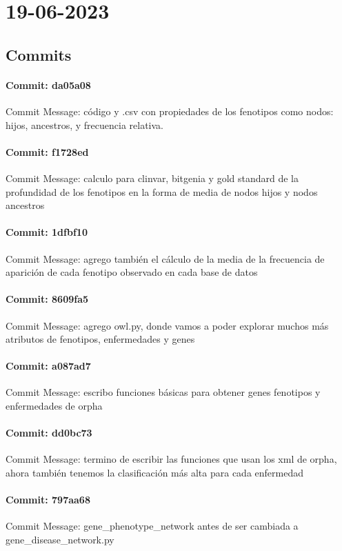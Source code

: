 \documentclass{article}
\begin{document}
\section{19-06-2023}
\subsection{Commits}
\paragraph{Commit: da05a08}
Commit Message: código y .csv con propiedades de los fenotipos como nodos: hijos, ancestros, y frecuencia relativa.

\paragraph{Commit: f1728ed}
Commit Message: calculo para clinvar, bitgenia y gold standard de la profundidad de los fenotipos en la forma de media de nodos hijos y nodos ancestros

\paragraph{Commit: 1dfbf10}
Commit Message: agrego también el cálculo de la media de la frecuencia de aparición de cada fenotipo observado en cada base de datos

\paragraph{Commit: 8609fa5}
Commit Message: agrego owl.py, donde vamos a poder explorar muchos más atributos de fenotipos, enfermedades y genes

\paragraph{Commit: a087ad7}
Commit Message: escribo funciones básicas para obtener genes fenotipos y enfermedades de orpha

\paragraph{Commit: dd0bc73}
Commit Message: termino de escribir las funciones que usan los xml de orpha, ahora también tenemos la clasificación más alta para cada enfermedad

\paragraph{Commit: 797aa68}
Commit Message: gene_phenotype_network antes de ser cambiada a gene_disease_network.py
\end{document}
